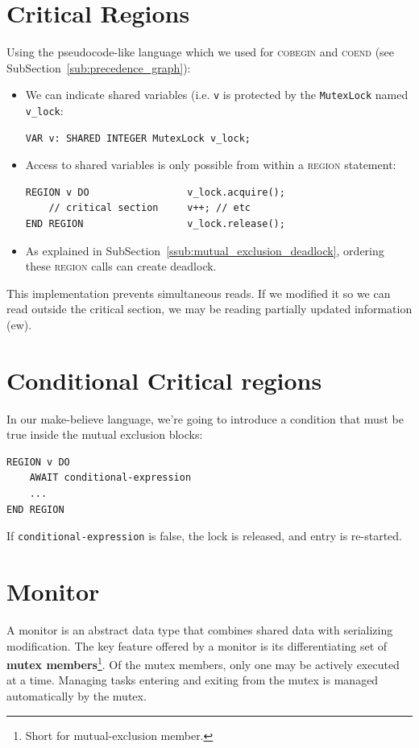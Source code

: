         \section{Critical Regions} %
        \label{sec:critical_regions}
            Using the pseudocode-like language which we used for \textsc{cobegin} and \textsc{coend} (see SubSection~\ref{sub:precedence_graph}):
            \begin{itemize}
                \item We can indicate shared variables (i.e. \verb|v| is protected by the \verb|MutexLock| named \verb|v_lock|:
                    \begin{verbatim}
VAR v: SHARED INTEGER MutexLock v_lock;
                    \end{verbatim}
                \item Access to shared variables is only possible from within a \textsc{region} statement:
                    \begin{verbatim}
REGION v DO                 v_lock.acquire();
    // critical section     v++; // etc
END REGION                  v_lock.release();
                    \end{verbatim}
                \item As explained in SubSection~\ref{ssub:mutual_exclusion_deadlock}, ordering these \textsc{region} calls can create deadlock.
            \end{itemize}
            This implementation prevents simultaneous reads.
            If we modified it so we can read outside the critical section, we may be reading partially updated information (ew).
        \section{Conditional Critical regions} %
        \label{sec:conditional_critical_regions}
            In our make-believe language, we're going to introduce a condition that must be true inside the mutual exclusion blocks:
            \begin{verbatim}
REGION v DO
    AWAIT conditional-expression
    ...
END REGION
            \end{verbatim}
            If \verb|conditional-expression| is false, the lock is released, and entry is re-started.
        \section{Monitor} %
        \label{sec:monitor}
            A monitor is an abstract data type that combines shared data with serializing modification.
            The key feature offered by a monitor is its differentiating set of \textbf{mutex members}\footnote{Short for mutual-exclusion member.}.
            Of the mutex members, only one may be actively executed at a time.
            Managing tasks entering and exiting from the mutex is managed automatically by the mutex.

